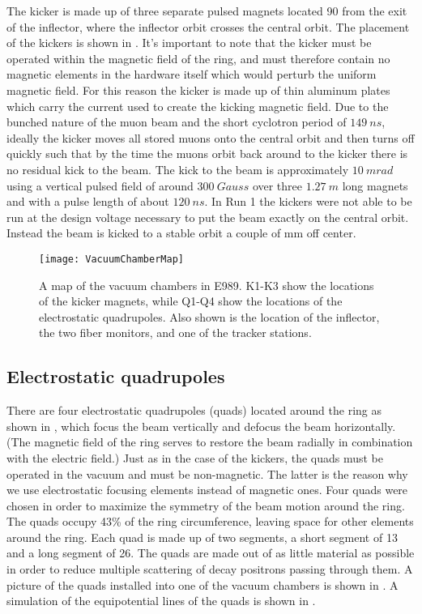 The kicker is made up of three separate pulsed magnets located 90\textdegree{} from the exit of the inflector, where the inflector orbit crosses the central orbit. The placement of the kickers is shown in . It's important to note that the kicker must be operated within the magnetic field of the ring, and must therefore contain no magnetic elements in the hardware itself which would perturb the uniform magnetic field. For this reason the kicker is made up of thin aluminum plates which carry the current used to create the kicking magnetic field. Due to the bunched nature of the muon beam and the short cyclotron period of $\SI{149}{ns}$, ideally the kicker moves all stored muons onto the central orbit and then turns off quickly such that by the time the muons orbit back around to the kicker there is no residual kick to the beam. The kick to the beam is approximately $\SI{10}{mrad}$ using a vertical pulsed field of around $\SI{300}{Gauss}$ over three $\SI{1.27}{m}$ long magnets and with a pulse length of about $\SI{120}{ns}$. In Run 1 the kickers were not able to be run at the design voltage necessary to put the beam exactly on the central orbit. Instead the beam is kicked to a stable orbit a couple of mm off center.  %

\begin{figure}[]
    \centering
    \texttt{[image: VacuumChamberMap]}
    \caption[Vacuum chamber map]{A map of the vacuum chambers in E989. K1-K3 show the locations of the kicker magnets, while Q1-Q4 show the locations of the electrostatic quadrupoles. Also shown is the location of the inflector, the two fiber monitors, and one of the tracker stations.}   
    \label{fig:vacmap}
\end{figure}

\subsection{Electrostatic quadrupoles}

There are four electrostatic quadrupoles (quads) located around the ring as shown in , which focus the beam vertically and defocus the beam horizontally. (The magnetic field of the ring serves to restore the beam radially in combination with the electric field.) Just as in the case of the kickers, the quads must be operated in the vacuum and must be non-magnetic. The latter is the reason why we use electrostatic focusing elements instead of magnetic ones. Four quads were chosen in order to maximize the symmetry of the beam motion around the ring. The quads occupy 43\% of the ring circumference, leaving space for other elements around the ring. Each quad is made up of two segments, a short segment of 13\textdegree{} and a long segment of 26\textdegree{}. The quads are made out of as little material as possible in order to reduce multiple scattering of decay positrons passing through them. A picture of the quads installed into one of the vacuum chambers is shown in . A simulation of the equipotential lines of the quads is shown in . 

